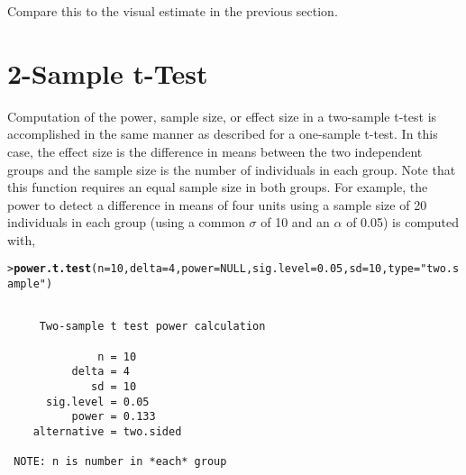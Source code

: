 \documentclass{article}\usepackage{graphicx, color}
\makeatletter
\newcommand{\hlfunctioncall}[1]{\textcolor[rgb]{0.501960784313725,0,0.329411764705882}{\textbf{#1}}}%
\newcommand{\hlstring}[1]{\textcolor[rgb]{0.6,0.6,1}{#1}}%
\newenvironment{kframe}{%
 \def\at@end@of@kframe{}%
 \ifinner\ifhmode%
  \def\at@end@of@kframe{\end{minipage}}%
  \begin{minipage}{\columnwidth}%
 \fi\fi%
 \def\FrameCommand##1{\hskip\@totalleftmargin \hskip-\fboxsep
 \colorbox{shadecolor}{##1}\hskip-\fboxsep
     \hskip-\linewidth \hskip-\@totalleftmargin \hskip\columnwidth}%
 \MakeFramed {\advance\hsize-\width
   \@totalleftmargin\z@ \linewidth\hsize
   \@setminipage}}%
 {\par\unskip\endMakeFramed%
 \at@end@of@kframe}
\newenvironment{knitrout}{}{} %
\makeatother
\begin{document}
Compare this to the visual estimate in the previous section.


\newpage
\section{2-Sample t-Test}
Computation of the power, sample size, or effect size in a two-sample t-test is accomplished in the same manner as described for a one-sample t-test.  In this case, the effect size is the difference in means between the two independent groups and the sample size is the number of individuals in each group.  Note that this function requires an equal sample size in both groups.  For example, the power to detect a difference in means of four units using a sample size of 20 individuals in each group (using a common $\sigma$ of 10 and an $\alpha$ of 0.05) is computed with,
\begin{knitrout}
\color{fgcolor}\begin{kframe}
\begin{alltt}
> \hlfunctioncall{power.t.test}(n=10,delta=4,power=NULL,sig.level=0.05,sd=10,type=\hlstring{"two.sample"})
\end{alltt}
\begin{verbatim}

     Two-sample t test power calculation 

              n = 10
          delta = 4
             sd = 10
      sig.level = 0.05
          power = 0.133
    alternative = two.sided

 NOTE: n is number in *each* group 
\end{verbatim}
\end{kframe}
\end{knitrout}
\end{document}
